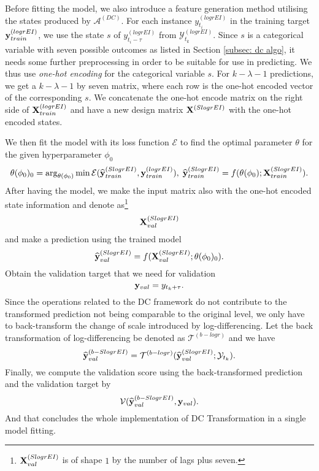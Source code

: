 Before fitting the model, we also introduce a feature generation method utilising the states produced by $\mathcal{A}^{(DC)}$. For each instance $y^{(logrEI)}_{t_i}$ in the training target $\mathbf{y}^{(logrEI)}_{train}$, we use the state $s$ of $y^{(logrEI)}_{t_i - \tau}$ from $\mathcal{Y}^{(logrEI)}_{t_k}$. Since $s$ is a categorical variable with seven possible outcomes as listed in Section \ref{subsec: dc algo}, it needs some further preprocessing in order to be suitable for use in predicting. We thus use \textit{one-hot encoding} for the categorical variable $s$. For $k - \lambda - 1$ predictions, we get a $k - \lambda - 1$ by seven matrix, where each row is the one-hot encoded vector of the corresponding $s$. We concatenate the one-hot encode matrix on the right side of $\mathbf{X}^{(logrEI)}_{train}$ and have a new design matrix $\mathbf{X}^{(SlogrEI)}$ with the one-hot encoded states.

We then fit the model with its loss function $\mathcal{E}$ to find the optimal parameter $\theta$ for the given hyperparameter $\phi_0$
\begin{equation*}
    \theta(\phi_0)_0 = \arg_{\theta(\phi_0)} \min \mathcal{E}(\widehat{\mathbf{y}}^{(SlogrEI)}_{train}, \mathbf{y}^{(logrEI)}_{train}), \; \widehat{\mathbf{y}}^{(SlogrEI)}_{train} = f(\theta(\phi_0); \mathbf{X}^{(SlogrEI)}_{train}).
\end{equation*}
After having the model, we make the input matrix also with the one-hot encoded state information and denote as\footnote{$\mathbf{X}^{(SlogrEI)}_{val}$ is of shape $1$ by the number of lags plus seven.}
\begin{equation*}
    \mathbf{X}^{(SlogrEI)}_{val}
\end{equation*}
and make a prediction using the trained model
\begin{equation*}
    \widehat{\mathbf{y}}^{(SlogrEI)}_{val} = f(\mathbf{X}^{(SlogrEI)}_{val} ; \theta(\phi_0)_0).
\end{equation*}
Obtain the validation target that we need for validation
\begin{equation*}
    \mathbf{y}_{val} = y_{t_k + \tau}.
\end{equation*}
Since the operations related to the DC framework do not contribute to the transformed prediction not being comparable to the original level, we only have to back-transform the change of scale introduced by log-differencing. Let the back transformation of log-differencing be denoted as $\mathcal{T}^{(b-logr)}$ and we have
\begin{equation*}
    \widehat{\mathbf{y}}^{(b-SlogrEI)}_{val} = \mathcal{T}^{(b-logr)} (\widehat{\mathbf{y}}^{(SlogrEI)}_{val} ; \mathcal{Y}_{t_k}).
\end{equation*}
Finally, we compute the validation score using the back-transformed prediction and the validation target by
\begin{equation*}
    \mathcal{V} (\widehat{\mathbf{y}}^{(b-SlogrEI)}_{val}, \mathbf{y}_{val}).
\end{equation*}
And that concludes the whole implementation of DC Transformation in a single model fitting.

